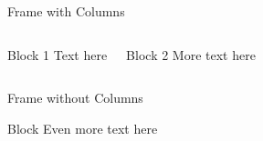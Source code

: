 \documentclass{beamer}
\begin{document}
        \begin{frame}[t]{Frame with Columns}
            \begin{columns}[t]

                \begin{block}{Block 1}
                    Text here
                \end{block}


                \begin{block}{Block 2}
                    More text here
                \end{block}
            \end{columns}
        \end{frame}

        \begin{frame}[t]{Frame without Columns}
            \leavevmode
            \begin{block}{Block}
                Even more text here
            \end{block}
        \end{frame}
\end{document}
